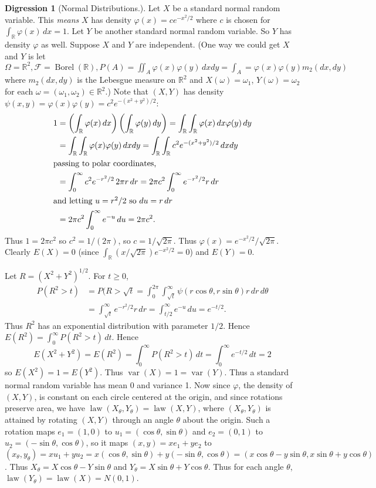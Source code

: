 \documentclass{article}
\DeclareMathOperator{\law}{law}
\DeclareMathOperator{\Borel}{Borel}
\newcommand{\R}{\mathbb{R}}
\newcommand{\F}{\mathscr{F}}
\DeclareMathOperator{\var}{var}
\theoremstyle{definition}
\newtheorem*{digression}{Digression}
\begin{document}
\begin{digression}[Normal Distributions.]
Let $X$ be a standard normal random variable. This \emph{means} $X$ has density $\varphi(x) = ce^{-x^2/2}$ where $c$ is chosen for $\int_\R \varphi(x)\,dx = 1$. Let $Y$ be another standard normal random variable. So $Y$ has density $\varphi$ as well. Suppose $X$ and $Y$ are independent. (One way we could get $X$ and $Y$ is let $\Omega = \R^2, \F = \Borel(\R), P(A) = \iint_A \varphi(x)\varphi(y) \,dxdy = \int_A = \varphi(x)\varphi(y) m_2(dx, dy)$ where $m_2(dx,dy)$ is the Lebesgue measure on $\R^2$ and $X(\omega) = \omega_1$, $Y(\omega) = \omega_2$ for each $\omega = (\omega_1, \omega_2) \in \R^2$.) Note that $(X,Y)$ has density $\psi(x,y) = \varphi(x)\varphi(y) = c^2e^{-(x^2+y^2)/2}$:
\begin{align*}
    1 &= \left(\int_\R \varphi(x)\,dx\right)\left(\int_\R \varphi(y)\,dy\right) 
        = \int_\R \int_\R \varphi(x)\,dx \varphi(y)\,dy \\
        &= \int_\R \int_\R \varphi(x)\varphi(y) \,dxdy 
        = \int_\R \int_\R c^2 e^{-(x^2+y^2)/2} \,dxdy \\
        \intertext{passing to polar coordinates,}
        &= \int_0^\infty c^2 e^{-r^2/2} \,2\pi r\,dr
        = 2\pi c^2 \int_0^\infty e^{-r^2/2} r\,dr \\
        \intertext{and letting $u = r^2/2$ so $du = r\,dr$}
        &= 2\pi c^2 \int_0^\infty e^{-u} \,du = 2\pi c^2.
\end{align*}
Thus $1 = 2\pi c^2$ so $c^2 = 1/(2\pi)$, so $c = 1/\sqrt{2\pi}$. Thus $\varphi(x) = e^{-x^2/2}/\sqrt{2\pi}$. Clearly $E(X) = 0$ (since $\int_\R (x/\sqrt{2\pi})e^{-x^2/2} = 0$) and $E(Y) = 0$.

Let $R = (X^2 + Y^2)^{1/2}$. For $t \geq 0$,
\begin{align*}
    P(R^2 > t) &= P(R > \sqrt{t} = \int_0^{2\pi} \int_{\sqrt{t}}^\infty \psi(r\cos\theta, r\sin\theta)r\,dr\,d\theta \\
    &= \int_{\sqrt{t}}^\infty e^{-r^2/2} r\,dr = \int_{t/2}^\infty e^{-u}\,du = e^{-t/2}.
\end{align*}
Thus $R^2$ has an exponential distribution with parameter $1/2$. Hence $E(R^2) = \int_0^\infty P(R^2 > t) \,dt$. Hence
\[
    E(X^2+Y^2) = E(R^2) = \int_0^\infty P(R^2 > t)\,dt = \int_0^\infty e^{-t/2}\,dt = 2
\]
so $E(X^2) = 1 = E(Y^2)$. Thus $\var(X) = 1 = \var(Y)$. Thus a standard normal random variable has mean 0 and variance 1. Now since $\varphi$, the density of $(X,Y)$, is constant on each circle centered at the origin, and since rotations preserve area, we have $\law(X_\theta, Y_\theta) = \law(X,Y)$, where $(X_\theta, Y_\theta)$ is attained by rotating $(X,Y)$ through an angle $\theta$ about the origin. Such a rotation maps $e_1 = (1,0)$ to $u_1 = (\cos\theta, \sin\theta)$ and $e_2 = (0,1)$ to $u_2 = (-\sin\theta, \cos\theta)$, so it maps $(x, y) = xe_1 + ye_2$ to $(x_\theta, y_\theta) = xu_1 + yu_2 = x(\cos\theta, \sin\theta) + y(-\sin\theta, \cos\theta) = (x\cos\theta - y\sin\theta, x\sin\theta + y\cos\theta)$. Thus $X_\theta = X\cos\theta - Y\sin\theta$ and $Y_\theta = X\sin\theta + Y\cos\theta$. Thus for each angle $\theta$, $\law(Y_\theta) = \law(X) = N(0,1)$.


\end{digression}
\end{document}
